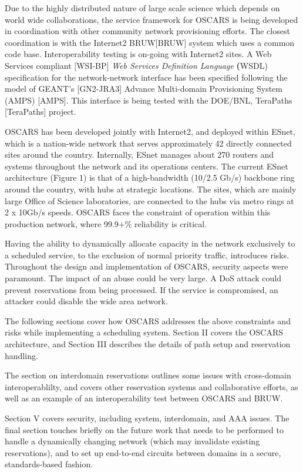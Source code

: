 \documentclass[conference]{IEEEtran}
\begin{document}
Due to the highly distributed nature of large scale science which depends
on world wide collaborations, the service framework for OSCARS is being
developed in  coordination with other community network provisioning efforts. 
The closest coordination is with the Internet2 BRUW[BRUW] system which 
uses a common code base. Interoperability testing is on-going with Internet2 
sites. 
A Web Services compliant [WSI-BP]\emph{ Web Services Definition Language}
 \textbf({WSDL}) specification for the network-network 
interface has been specified following the model of GEANT's [GN2-JRA3] 
Advance Multi-domain Provisioning System (AMPS) [AMPS]. This interface is being 
tested with the DOE/BNL, TeraPaths [TeraPaths] project. 
 
OSCARS has been developed jointly with Internet2, and deployed within ESnet,
which is a nation-wide network that serves approximately 42 directly connected 
sites around the country.  Internally, ESnet manages about 270 routers and 
systems throughout the network and its operations centers.  The current ESnet 
architecture (Figure 1) is that of a high-bandwidth (10/2.5 Gb/s) backbone ring 
around the country, with hubs at strategic locations.  The sites, which are 
mainly
large Office of Science laboratories, are connected to the hubs via metro rings at 2 x 10Gb/s speeds.
OSCARS faces the constraint of operation within this production 
network, where 99.9+\% reliability is critical.

Having the ability to dynamically allocate capacity in the network exclusively 
to a scheduled service, to the exclusion of normal priority traffic, introduces 
risks.
Throughout the design and implementation of OSCARS, security aspects were
paramount.  The impact of an abuse could be very
large.  A DoS attack could prevent reservations from being processed.  If the
service is compromised, an attacker could disable the wide area network.

The following sections cover how OSCARS addresses the above constraints and
risks while implementing a scheduling system.  Section II covers the 
OSCARS architecture, and Section III describes the details of
path setup and reservation handling.

The section on interdomain reservations outlines some issues with cross-domain
 interoperablilty, and covers other reservation systems and 
collaborative efforts, as well as 
an example of an interoperability test between OSCARS and BRUW.

Section V covers security, including system, interdomain, and AAA issues.
The final section touches briefly on the future work that needs to be performed
to handle a dynamically changing network (which may invalidate existing
reservations), and to set up end-to-end circuits between domains
in a secure, standards-based fashion.
\end{document}
